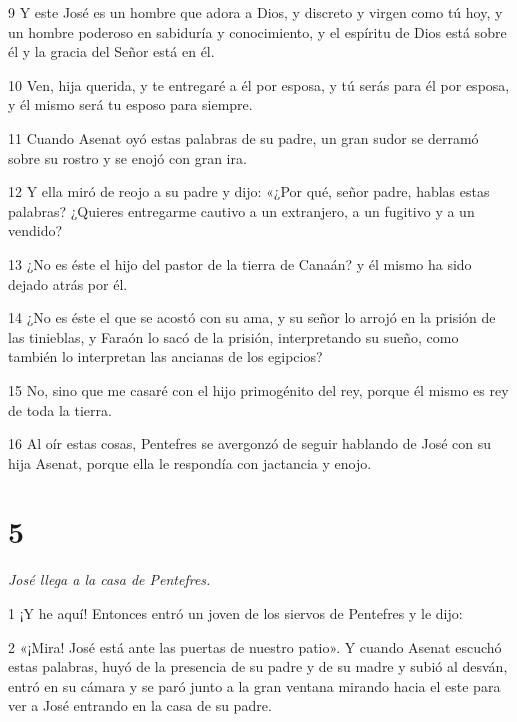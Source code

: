 \par 9 Y este José es un hombre que adora a Dios, y discreto y virgen como tú hoy, y un hombre poderoso en sabiduría y conocimiento, y el espíritu de Dios está sobre él y la gracia del Señor está en él.

\par 10 Ven, hija querida, y te entregaré a él por esposa, y tú serás para él por esposa, y él mismo será tu esposo para siempre.

\par 11 Cuando Asenat oyó estas palabras de su padre, un gran sudor se derramó sobre su rostro y se enojó con gran ira.

\par 12 Y ella miró de reojo a su padre y dijo: «¿Por qué, señor padre, hablas estas palabras? ¿Quieres entregarme cautivo a un extranjero, a un fugitivo y a un vendido?

\par 13 ¿No es éste el hijo del pastor de la tierra de Canaán? y él mismo ha sido dejado atrás por él.

\par 14 ¿No es éste el que se acostó con su ama, y ​​su señor lo arrojó en la prisión de las tinieblas, y Faraón lo sacó de la prisión, interpretando su sueño, como también lo interpretan las ancianas de los egipcios?

\par 15 No, sino que me casaré con el hijo primogénito del rey, porque él mismo es rey de toda la tierra.

\par 16 Al oír estas cosas, Pentefres se avergonzó de seguir hablando de José con su hija Asenat, porque ella le respondía con jactancia y enojo.

\chapter{5}

\textit{José llega a la casa de Pentefres.}

\par 1 ¡Y he aquí! Entonces entró un joven de los siervos de Pentefres y le dijo:

\par 2 «¡Mira! José está ante las puertas de nuestro patio». Y cuando Asenat escuchó estas palabras, huyó de la presencia de su padre y de su madre y subió al desván, entró en su cámara y se paró junto a la gran ventana mirando hacia el este para ver a José entrando en la casa de su padre.

